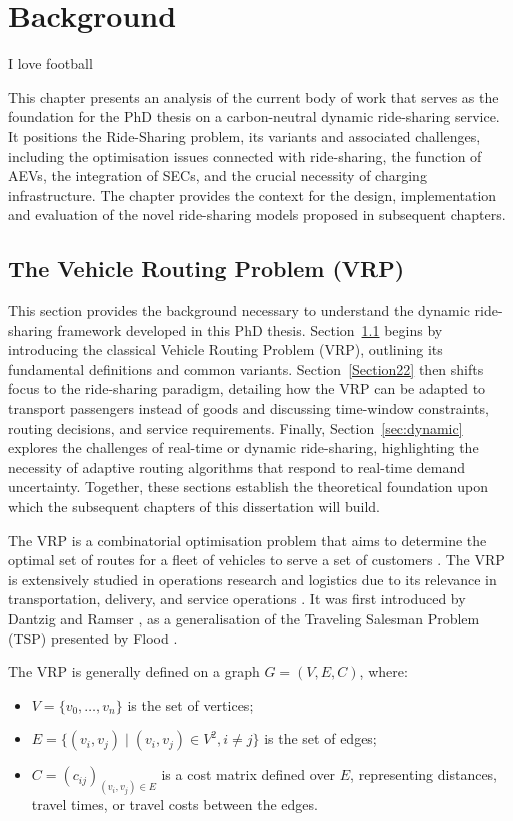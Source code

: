 \chapter{Background}
\label{chapter2}

I love football \cite{sarmento2014match}

This chapter presents an analysis of the current body of work that serves as the foundation for the PhD thesis on a carbon-neutral dynamic ride-sharing service. It positions the Ride-Sharing problem, its variants and associated challenges, including the optimisation issues connected with ride-sharing, the function of AEVs, the integration of SECs, and the crucial necessity of charging infrastructure. The chapter provides the context for the design, implementation and evaluation of the novel ride-sharing models proposed in subsequent chapters.

\section{The Vehicle Routing Problem (VRP)}
\label{sec:vrp}
This section provides the background necessary to understand the dynamic ride-sharing framework developed in this PhD thesis. Section~\ref{sec:vrp} begins by introducing the classical Vehicle Routing Problem (VRP), outlining its fundamental definitions and common variants. Section~\ref{Section22} then shifts focus to the ride-sharing paradigm, detailing how the VRP can be adapted to transport passengers instead of goods and discussing time-window constraints, routing decisions, and service requirements. Finally, Section~\ref{sec:dynamic} explores the challenges of real-time or dynamic ride-sharing, highlighting the necessity of adaptive routing algorithms that respond to real-time demand uncertainty. Together, these sections establish the theoretical foundation upon which the subsequent chapters of this dissertation will build.

The VRP is a combinatorial optimisation problem that aims to determine the optimal set of routes for a fleet of vehicles to serve a set of customers \cite{pan2023review}. The VRP is extensively studied in operations research and logistics due to its relevance in transportation, delivery, and service operations \cite{maroof2023vehicle}. It was first introduced by Dantzig and Ramser \cite{dantzig1959truck}, as a generalisation of the Traveling Salesman Problem (TSP) presented by Flood \cite{flood1956traveling}. 

The VRP is generally defined on a graph $G = (V, E, C)$, where:
\begin{itemize}
    \item $V = \{v_0, \dots, v_n\}$ is the set of vertices;
    \item $E = \{(v_i, v_j) \mid (v_i, v_j) \in V^2, i \neq j\}$ is the set of edges;
    \item $C = (c_{ij})_{(v_i, v_j) \in E}$ is a cost matrix defined over $E$, representing distances, travel times, or travel costs between the edges.
\end{itemize}

